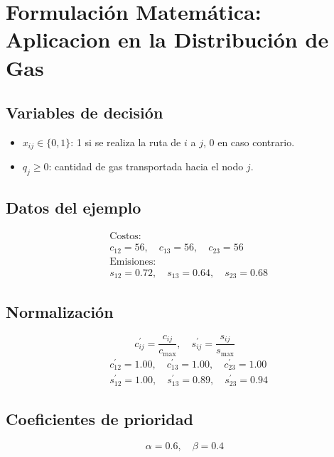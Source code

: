 \documentclass[11pt, a4paper]{article}
\begin{document}
\section{Formulación Matemática: Aplicacion en la Distribución de Gas}

\subsection{Variables de decisión}
\begin{itemize}[leftmargin=*]
    \item \( x_{ij} \in \{0,1\} \): 1 si se realiza la ruta de \(i\) a \(j\), 0 en caso contrario.
    \item \( q_j \geq 0 \): cantidad de gas transportada hacia el nodo \(j\).
\end{itemize}

\subsection{Datos del ejemplo}
\begin{align}
&\text{Costos:} \nonumber \\
& c_{12} = 56,\quad c_{13} = 56,\quad c_{23} = 56 \nonumber \\
& \text{Emisiones:} \nonumber \\
& s_{12} = 0.72,\quad s_{13} = 0.64,\quad s_{23} = 0.68 \nonumber
\end{align}

\subsection{Normalización}
\begin{equation}
c_{ij}^\prime = \frac{c_{ij}}{c_{\max}}, \quad s_{ij}^\prime = \frac{s_{ij}}{s_{\max}}
\end{equation}
\begin{align}
& c_{12}^\prime = 1.00,\quad c_{13}^\prime = 1.00,\quad c_{23}^\prime = 1.00 \nonumber \\
& s_{12}^\prime = 1.00,\quad s_{13}^\prime = 0.89,\quad s_{23}^\prime = 0.94 \nonumber
\end{align}

\subsection{Coeficientes de prioridad}
\begin{equation}
\alpha = 0.6,\quad \beta = 0.4
\end{equation}
\end{document}

